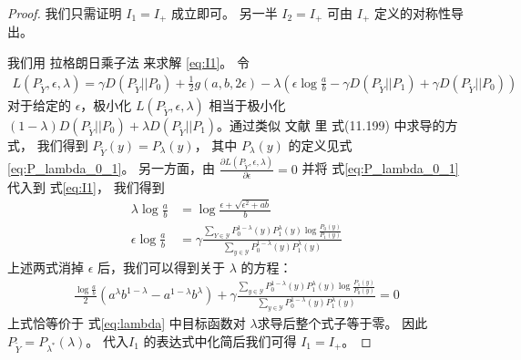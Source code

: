 \begin{proof}
    我们只需证明 $I_1=I_+$ 成立即可。
另一半 $I_2=I_+$ 可由 $I_+$ 定义的对称性导出。

我们用 拉格朗日乘子法 来求解 \eqref{eq:I1}。
令
\begin{align*}
L(P_{\widetilde{Y}},\epsilon, \lambda)
=\gamma D(P_{\widetilde{Y}}|| P_0)+
\frac{1}{2} g(a,b, 2\epsilon)
- \lambda(\epsilon \log\frac{a}{b}-\gamma
D(P_{\widetilde{Y}} || P_1) + \gamma D(P_{\widetilde{Y}} || P_0))
\end{align*}
对于给定的 $\epsilon$，极小化 $L(P_{\widetilde{Y}},\epsilon, \lambda)$
相当于极小化
$(1-\lambda)D(P_{\widetilde{Y}} || P_0) +
\lambda D(P_{\widetilde{Y}} || P_1) $。通过类似
文献  里 式(11.199) 中求导的方式，
我们得到 $P_{\widetilde{Y}}(y) = P_{\lambda}(y)$，
其中 $P_{\lambda}(y)$ 的定义见式\eqref{eq:P_lambda_0_1}。
另一方面，由 $\frac{\partial L(P_{\widetilde{Y}},\epsilon, \lambda)}{\partial \epsilon}=0$
并将 式\eqref{eq:P_lambda_0_1}
代入到 式\eqref{eq:I1}， 我们得到
\begin{align*}
\lambda \log \frac{a}{b}
& = \log \frac{\epsilon + \sqrt{\epsilon^2+ab}}{b} \\
\epsilon \log \frac{a}{b}
& = \gamma\frac{\sum_{Y \in \mathcal{Y}}P_0^{1-\lambda}(y) P_1^{\lambda} (y)
\log \frac{P_0(y)}{P_1(y)}}{\sum_{y \in \mathcal{Y}}
P_0^{1-\lambda}(y) P_1^{\lambda} (y)}
\end{align*}
上述两式消掉 $\epsilon$ 后，我们可以得到关于
$\lambda$ 的方程：
\begin{align*}
\frac{\log\frac{a}{b}}{2}
\left(a^{\lambda} b^{1-\lambda}
-a^{1-\lambda} b^{\lambda}\right)
+ \gamma \frac{\sum_{y \in \mathcal{Y}}
P_0^{1-\lambda}(y) P_1^{\lambda}(y)
\log \frac{P_1(y)}{P_0(y)}}
{\sum_{y \in \mathcal{Y}}P_0^{1-\lambda}(y)
P_1^{\lambda} (y)}
=0
\end{align*}
上式恰等价于 式\eqref{eq:lambda} 中目标函数对 $\lambda$求导后整个式子等于零。
因此$P_{\widetilde{Y}}=P_{\lambda^*}(\lambda)$。
代入$I_1$ 的表达式中化简后我们可得
$I_1 = I_+$。
\end{proof}

